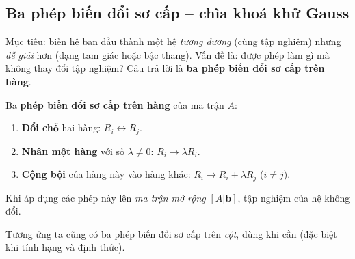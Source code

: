 \documentclass[12pt,a4paper]{article}
\begin{document}
\begin{center}
\end{center}

\subsection{Ba phép biến đổi sơ cấp -- chìa khoá khử Gauss}

\begin{dongco}
Mục tiêu: biến hệ ban đầu thành một hệ \emph{tương đương} (cùng tập nghiệm) nhưng \emph{dễ giải} hơn (dạng tam giác hoặc bậc thang). Vấn đề là: được phép làm gì mà không thay đổi tập nghiệm? Câu trả lời là \textbf{ba phép biến đổi sơ cấp trên hàng}.
\end{dongco}

\begin{dinhnghia}
  Ba \textbf{phép biến đổi sơ cấp trên hàng} của ma trận $A$:
  \begin{enumerate}
    \item \textbf{Đổi chỗ} hai hàng: $R_i \leftrightarrow R_j$.
    \item \textbf{Nhân một hàng} với số $\lambda \ne 0$: $R_i \to \lambda R_i$.
    \item \textbf{Cộng bội} của hàng này vào hàng khác: $R_i \to R_i + \lambda R_j$ ($i \ne j$).
  \end{enumerate}
  Khi áp dụng các phép này lên \emph{ma trận mở rộng} $[A|\mathbf{b}]$, tập nghiệm của hệ không đổi.

  Tương ứng ta cũng có ba phép biến đổi sơ cấp trên \emph{cột}, dùng khi cần (đặc biệt khi tính hạng và định thức).
\end{dinhnghia}
\end{document}
